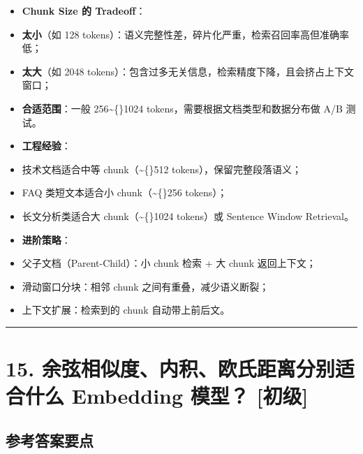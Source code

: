 \documentclass[9pt,a4paper,twocolumn]{ctexart}
\newcommand{\lvchu}{\usebox{\badgechubox}}
\def\lvchu{[初级]}%
\begin{document}
\begin{itemize}[itemsep=1pt, topsep=2pt]
  \item \textbf{Chunk Size 的 Tradeoff}：
  \item \textbf{太小}（如 128 tokens）：语义完整性差，碎片化严重，检索召回率高但准确率低；
  \item \textbf{太大}（如 2048 tokens）：包含过多无关信息，检索精度下降，且会挤占上下文窗口；
  \item \textbf{合适范围}：一般 256\textasciitilde\{\}1024 tokens，需要根据文档类型和数据分布做 A/B 测试。
  \item \textbf{工程经验}：
  \item 技术文档适合中等 chunk（\textasciitilde\{\}512 tokens），保留完整段落语义；
  \item FAQ 类短文本适合小 chunk（\textasciitilde\{\}256 tokens）；
  \item 长文分析类适合大 chunk（\textasciitilde\{\}1024 tokens）或 Sentence Window Retrieval。
  \item \textbf{进阶策略}：
  \item 父子文档（Parent-Child）：小 chunk 检索 + 大 chunk 返回上下文；
  \item 滑动窗口分块：相邻 chunk 之间有重叠，减少语义断裂；
  \item 上下文扩展：检索到的 chunk 自动带上前后文。
\end{itemize}


\vspace{2pt}
\noindent\rule{\columnwidth}{0.3pt}\vspace{2pt}



\section*{15. 余弦相似度、内积、欧氏距离分别适合什么 Embedding 模型？ \lvchu{}}


\subsection*{参考答案要点}
\end{document}
